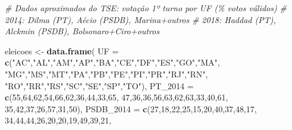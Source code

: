 \documentclass[
]{article}
\newenvironment{Shaded}{\begin{snugshade}}{\end{snugshade}}
\newcommand{\AttributeTok}[1]{\textcolor[rgb]{0.13,0.29,0.53}{#1}}
\newcommand{\CommentTok}[1]{\textcolor[rgb]{0.56,0.35,0.01}{\textit{#1}}}
\newcommand{\DecValTok}[1]{\textcolor[rgb]{0.00,0.00,0.81}{#1}}
\newcommand{\FunctionTok}[1]{\textcolor[rgb]{0.13,0.29,0.53}{\textbf{#1}}}
\newcommand{\NormalTok}[1]{#1}
\newcommand{\OtherTok}[1]{\textcolor[rgb]{0.56,0.35,0.01}{#1}}
\newcommand{\StringTok}[1]{\textcolor[rgb]{0.31,0.60,0.02}{#1}}
\begin{document}
\begin{Shaded}
\begin{Highlighting}[]
\CommentTok{\# Dados aproximados do TSE: votação 1º turno por UF (\% votos válidos)}
\CommentTok{\# 2014: Dilma (PT), Aécio (PSDB), Marina+outros}
\CommentTok{\# 2018: Haddad (PT), Alckmin (PSDB), Bolsonaro+Ciro+outros}

\NormalTok{eleicoes }\OtherTok{\textless{}{-}} \FunctionTok{data.frame}\NormalTok{(}
  \AttributeTok{UF =} \FunctionTok{c}\NormalTok{(}\StringTok{"AC"}\NormalTok{,}\StringTok{"AL"}\NormalTok{,}\StringTok{"AM"}\NormalTok{,}\StringTok{"AP"}\NormalTok{,}\StringTok{"BA"}\NormalTok{,}\StringTok{"CE"}\NormalTok{,}\StringTok{"DF"}\NormalTok{,}\StringTok{"ES"}\NormalTok{,}\StringTok{"GO"}\NormalTok{,}\StringTok{"MA"}\NormalTok{,}
         \StringTok{"MG"}\NormalTok{,}\StringTok{"MS"}\NormalTok{,}\StringTok{"MT"}\NormalTok{,}\StringTok{"PA"}\NormalTok{,}\StringTok{"PB"}\NormalTok{,}\StringTok{"PE"}\NormalTok{,}\StringTok{"PI"}\NormalTok{,}\StringTok{"PR"}\NormalTok{,}\StringTok{"RJ"}\NormalTok{,}\StringTok{"RN"}\NormalTok{,}
         \StringTok{"RO"}\NormalTok{,}\StringTok{"RR"}\NormalTok{,}\StringTok{"RS"}\NormalTok{,}\StringTok{"SC"}\NormalTok{,}\StringTok{"SE"}\NormalTok{,}\StringTok{"SP"}\NormalTok{,}\StringTok{"TO"}\NormalTok{),}
  \AttributeTok{PT\_2014  =} \FunctionTok{c}\NormalTok{(}\DecValTok{55}\NormalTok{,}\DecValTok{64}\NormalTok{,}\DecValTok{62}\NormalTok{,}\DecValTok{54}\NormalTok{,}\DecValTok{66}\NormalTok{,}\DecValTok{62}\NormalTok{,}\DecValTok{36}\NormalTok{,}\DecValTok{44}\NormalTok{,}\DecValTok{33}\NormalTok{,}\DecValTok{65}\NormalTok{,}
               \DecValTok{47}\NormalTok{,}\DecValTok{36}\NormalTok{,}\DecValTok{36}\NormalTok{,}\DecValTok{56}\NormalTok{,}\DecValTok{63}\NormalTok{,}\DecValTok{62}\NormalTok{,}\DecValTok{63}\NormalTok{,}\DecValTok{33}\NormalTok{,}\DecValTok{40}\NormalTok{,}\DecValTok{61}\NormalTok{,}
               \DecValTok{35}\NormalTok{,}\DecValTok{42}\NormalTok{,}\DecValTok{37}\NormalTok{,}\DecValTok{26}\NormalTok{,}\DecValTok{57}\NormalTok{,}\DecValTok{31}\NormalTok{,}\DecValTok{50}\NormalTok{),}
  \AttributeTok{PSDB\_2014 =} \FunctionTok{c}\NormalTok{(}\DecValTok{27}\NormalTok{,}\DecValTok{18}\NormalTok{,}\DecValTok{22}\NormalTok{,}\DecValTok{25}\NormalTok{,}\DecValTok{15}\NormalTok{,}\DecValTok{20}\NormalTok{,}\DecValTok{40}\NormalTok{,}\DecValTok{37}\NormalTok{,}\DecValTok{48}\NormalTok{,}\DecValTok{17}\NormalTok{,}
                \DecValTok{34}\NormalTok{,}\DecValTok{44}\NormalTok{,}\DecValTok{44}\NormalTok{,}\DecValTok{26}\NormalTok{,}\DecValTok{20}\NormalTok{,}\DecValTok{20}\NormalTok{,}\DecValTok{19}\NormalTok{,}\DecValTok{49}\NormalTok{,}\DecValTok{39}\NormalTok{,}\DecValTok{21}\NormalTok{,}

\end{Highlighting}
\end{Shaded}
\end{document}
